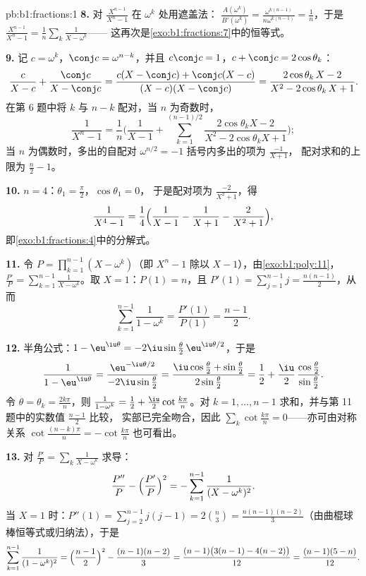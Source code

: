 \begin{solution}{pb:b1:fractions:1}
\textbf{8.} 对 $\frac{X^{n-1}}{X^n - 1}$ 在 $\omega^k$ 处用遮盖法：
$\frac{A(\omega^k)}{B'(\omega^k)} =
\frac{\omega^{k(n-1)}}{n\omega^{k(n-1)}} = \frac1n$，于是
$\frac{X^{n-1}}{X^n-1} = \frac1n\sum_k\frac1{X - \omega^k}$——
这再次是\cref{exo:b1:fractions:7}中的恒等式。

\textbf{9.} 记 $c = \omega^k$，$\conj c = \omega^{n-k}$，并且
$c\conj c = 1$，$c + \conj c = 2\cos\theta_k$：
\[
\frac{c}{X - c} + \frac{\conj c}{X - \conj c}
= \frac{c(X - \conj c) + \conj c(X - c)}
{(X - c)(X - \conj c)}
= \frac{2\cos\theta_k\,X - 2}{X^2 - 2\cos\theta_k\,X + 1} .
\]
在第 6 题中将 $k$ 与 $n - k$ 配对，当 $n$ 为奇数时，
\[
\frac1{X^n - 1} = \frac1n\Biggl(\frac1{X-1} +
\sum_{k=1}^{(n-1)/2}
\frac{2\cos\theta_k X - 2}{X^2 - 2\cos\theta_k X + 1}\Biggr) ;
\]
当 $n$ 为偶数时，多出的自配对 $\omega^{n/2} = -1$
括号内多出的项为 $\frac{-1}{X+1}$，
配对求和的上限为 $\frac n2 - 1$。

\textbf{10.} $n = 4$：$\theta_1 = \frac\pi2$，$\cos\theta_1 = 0$，
于是配对项为 $\frac{-2}{X^2+1}$，得
\[
\frac1{X^4-1} = \frac14\Bigl(\frac1{X-1} - \frac1{X+1}
- \frac2{X^2+1}\Bigr) ,
\]
即\cref{exo:b1:fractions:4}中的分解式。

\textbf{11.} 令 $P = \prod_{k=1}^{n-1}(X - \omega^k)$（即 $X^n -
1$ 除以 $X - 1$），由\cref{exo:b1:poly:11}，$\frac{P'}P =
\sum_{k=1}^{n-1}\frac1{X-\omega^k}$。取 $X = 1$：$P(1) = n$，且
$P'(1) = \sum_{j=1}^{n-1}j = \frac{n(n-1)}2$，从而
\[
\sum_{k=1}^{n-1}\frac1{1 - \omega^k}
= \frac{P'(1)}{P(1)} = \frac{n-1}2 .
\]

\textbf{12.} 半角公式：$1 - \eu^{\iu\theta} =
-2\iu\sin\frac\theta2\,\eu^{\iu\theta/2}$，于是
\[
\frac1{1 - \eu^{\iu\theta}}
= \frac{\eu^{-\iu\theta/2}}{-2\iu\sin\frac\theta2}
= \frac{\iu\cos\frac\theta2 + \sin\frac\theta2}
{2\sin\frac\theta2}
= \frac12 + \frac\iu2\,
\frac{\cos\frac\theta2}{\sin\frac\theta2} .
\]
令 $\theta = \theta_k = \frac{2k\pi}n$，则 $\frac1{1-\omega^k} =
\frac12 + \frac\iu2\cot\frac{k\pi}n$。对 $k = 1, \dots,
n-1$ 求和，并与第 11 题中的实数值 $\frac{n-1}2$ 比较，
实部已完全吻合，因此
$\sum_k\cot\frac{k\pi}n = 0$——亦可由对称关系 $\cot\frac{(n-k)
\pi}n = -\cot\frac{k\pi}n$ 也可看出。

\textbf{13.} 对 $\frac{P'}P = \sum_k\frac1{X -
\omega^k}$ 求导：
\[
\frac{P''}P - \Bigl(\frac{P'}P\Bigr)^2
= -\sum_{k=1}^{n-1}\frac1{(X - \omega^k)^2} .
\]
当 $X = 1$ 时：$P''(1) = \sum_{j=2}^{n-1}j(j-1) = 2\binom n3 =
\frac{n(n-1)(n-2)}3$（由曲棍球棒恒等式或归纳法），于是
\[
\sum_{k=1}^{n-1}\frac1{(1 - \omega^k)^2}
= \Bigl(\frac{n-1}2\Bigr)^2 - \frac{(n-1)(n-2)}3
= \frac{(n-1)\bigl(3(n-1) - 4(n-2)\bigr)}{12}
= \frac{(n-1)(5-n)}{12} .
\]


\end{solution}
